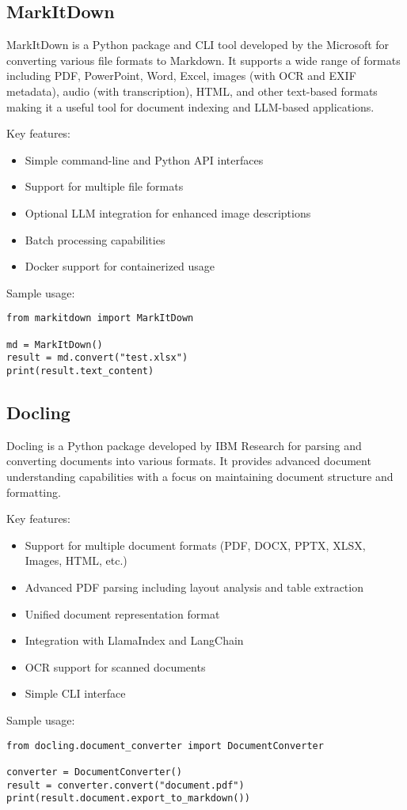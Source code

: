 \subsection{MarkItDown}

MarkItDown  is a Python package and CLI tool developed by the Microsoft for converting various file formats to Markdown. It supports a wide range of formats including PDF, PowerPoint, Word, Excel, images (with OCR and EXIF metadata), audio (with transcription), HTML, and other text-based formats making it a useful tool for document indexing and LLM-based applications.

Key features:
\begin{itemize}
    \item Simple command-line and Python API interfaces
    \item Support for multiple file formats
    \item Optional LLM integration for enhanced image descriptions
    \item Batch processing capabilities
    \item Docker support for containerized usage
\end{itemize}
Sample usage:
\begin{verbatim}
from markitdown import MarkItDown

md = MarkItDown()
result = md.convert("test.xlsx")
print(result.text_content)
\end{verbatim}

\subsection{Docling}

Docling  is a Python package developed by IBM Research for parsing and converting documents into various formats. It provides advanced document understanding capabilities with a focus on maintaining document structure and formatting.

Key features:
\begin{itemize}
    \item Support for multiple document formats (PDF, DOCX, PPTX, XLSX, Images, HTML, etc.)
    \item Advanced PDF parsing including layout analysis and table extraction 
    \item Unified document representation format
    \item Integration with LlamaIndex and LangChain
    \item OCR support for scanned documents
    \item Simple CLI interface
\end{itemize}
Sample usage:
\begin{verbatim}
from docling.document_converter import DocumentConverter

converter = DocumentConverter()
result = converter.convert("document.pdf")
print(result.document.export_to_markdown())
\end{verbatim}

